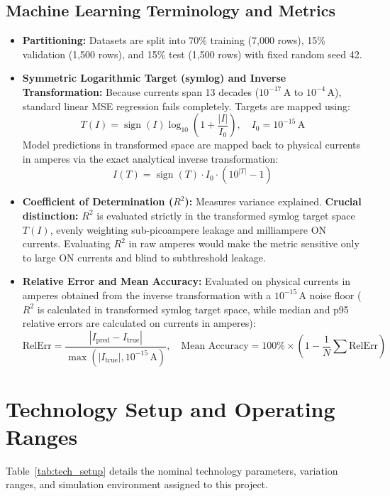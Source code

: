 \documentclass[11pt,a4paper]{article}
\numberwithin{table}{section}
\numberwithin{figure}{section}
\begin{document}
\subsection{Machine Learning Terminology and Metrics}
\begin{itemize}[noitemsep]
    \item \textbf{Partitioning:} Datasets are split into 70\% training (7,000 rows), 15\% validation (1,500 rows), and 15\% test (1,500 rows) with fixed random seed 42.
    \item \textbf{Symmetric Logarithmic Target (symlog) and Inverse Transformation:} Because currents span 13 decades ($10^{-17}\,\mathrm{A}$ to $10^{-4}\,\mathrm{A}$), standard linear MSE regression fails completely. Targets are mapped using:
    \begin{equation}
    T(I) = \operatorname{sign}(I)\log_{10}\left(1 + \frac{|I|}{I_0}\right), \quad I_0 = 10^{-15}\,\mathrm{A}
    \end{equation}
    Model predictions in transformed space are mapped back to physical currents in amperes via the exact analytical inverse transformation:
    \begin{equation}
    I(T) = \operatorname{sign}(T) \cdot I_0 \cdot \left(10^{|T|} - 1\right)
    \end{equation}
    \item \textbf{Coefficient of Determination ($R^2$):} Measures variance explained. \textbf{Crucial distinction:} $R^2$ is evaluated strictly in the transformed symlog target space $T(I)$, evenly weighting sub-picoampere leakage and milliampere ON currents. Evaluating $R^2$ in raw amperes would make the metric sensitive only to large ON currents and blind to subthreshold leakage.
    \item \textbf{Relative Error and Mean Accuracy:} Evaluated on physical currents in amperes obtained from the inverse transformation with a $10^{-15}\,\mathrm{A}$ noise floor ($R^2$ is calculated in transformed symlog target space, while median and p95 relative errors are calculated on currents in amperes):
    \begin{equation}
    \text{RelErr} = \frac{|I_{\mathrm{pred}} - I_{\mathrm{true}}|}{\max(|I_{\mathrm{true}}|, 10^{-15}\,\mathrm{A})}, \quad \text{Mean Accuracy} = 100\% \times \left(1 - \frac{1}{N}\sum \text{RelErr}\right)
    \end{equation}
\end{itemize}

\section{Technology Setup and Operating Ranges}
Table~\ref{tab:tech_setup} details the nominal technology parameters, variation ranges, and simulation environment assigned to this project.
\end{document}
